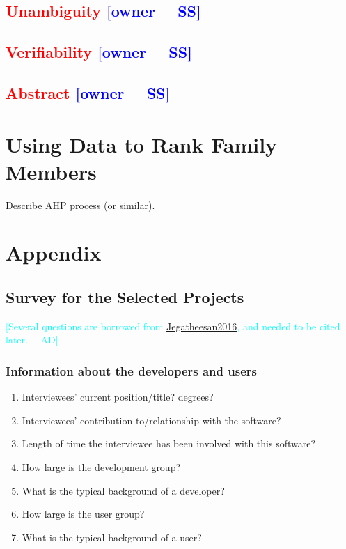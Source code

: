 \documentclass[letterpaper,cleveref]{lipics-v2019}
\newcommand{\authornote}[3]{\textcolor{#1}{[#3 ---#2]}}
\newcommand{\authornote}[3]{}
\newcommand{\wss}[1]{\authornote{blue}{SS}{#1}} %
\newcommand{\ad}[1]{\authornote{cyan}{AD}{#1}} %
\newcommand{\notdone}[1]{\textcolor{red}{#1}}
\theoremstyle{definition}
\begin{document}
\subsection{\notdone{Unambiguity} \wss{owner}}

\subsection{\notdone{Verifiability} \wss{owner}}

\subsection{\notdone{Abstract} \wss{owner}}

\section{Using Data to Rank Family Members}

Describe AHP process (or similar).

\appendix
\section{Appendix}
\subsection{Survey for the Selected Projects}
\ad{Several questions are borrowed from \href{https://gitlab.cas.mcmaster.ca/smiths/pub/-/blob/master/Jegatheesan2016.pdf}{Jegatheesan2016}, and needed to be cited later.}
\subsubsection{Information about the developers and users}
\begin{enumerate}
\item Interviewees' current position/title? degrees?
\item Interviewees' contribution to/relationship with the software?
\item Length of time the interviewee has been involved with this software?
\item How large is the development group?
\item What is the typical background of a developer?
\item How large is the user group?
\item What is the typical background of a user?
\end{enumerate}
\end{document}
